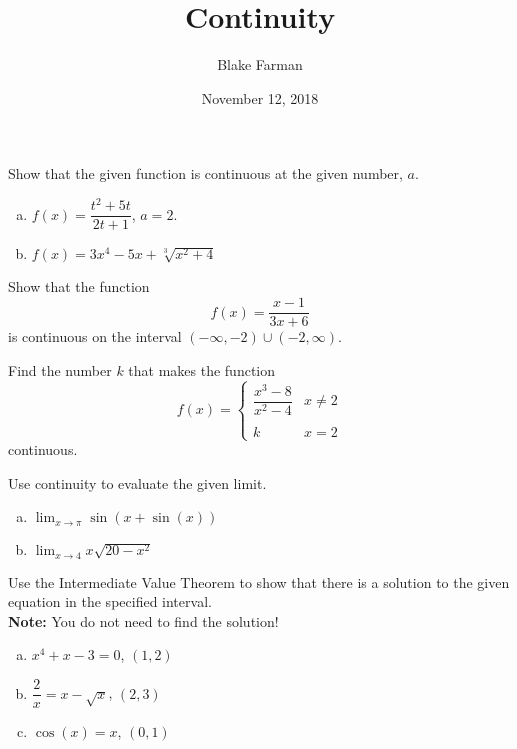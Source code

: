 \documentclass[10pt]{amsart}
\title{Continuity}
\date{November 12, 2018}
\author{Blake Farman}
\begin{document}
\maketitle

\makenameslot

\begin{thm}
  Show that the given function is continuous at the given number, \(a\).
  \begin{enumerate}[(a)]
  \item
    \(f(x) = \dfrac{t^2 + 5t}{2t + 1}\), \(a = 2\).
    \vspace{2in}
  \item
    \(\displaystyle{f(x) = 3x^4 - 5x + \sqrt[3]{x^2 +4}}\)
  \end{enumerate}
\end{thm}

\newpage

\begin{thm}
  Show that the function
  \[f(x) = \frac{x - 1}{3x + 6}\]
  is continuous on the interval \((-\infty, -2) \cup (-2,\infty)\).
\end{thm}

\vspace{2in}

\begin{thm}
  Find the number \(k\) that makes the function
  \[f(x) = \left\{\begin{array}{cc}
  \dfrac{x^3 - 8}{x^2 - 4} & x \neq 2\\
  \\
  k & x = 2
  \end{array}\right.\]
  continuous.
\end{thm}

\vspace{2in}

\begin{thm}
  Use continuity to evaluate the given limit.
  \begin{enumerate}[(a)]
  \item
    \(\displaystyle{\lim_{x \to \pi} \sin\left(x + \sin(x)\right)}\)
    \vspace{1in}
  \item
    \(\displaystyle{\lim_{x \to 4} x\sqrt{20 - x^2}}\)
  \end{enumerate}
\end{thm}

\newpage

\begin{thm}
  Use the Intermediate Value Theorem to show that there is a solution to the given equation in the specified interval.\\
  \textbf{Note:} You do not need to find the solution!
  \begin{enumerate}[(a)]
  \item
    \(x^4 + x - 3 = 0\), \((1,2)\)
    \vspace{2in}
  \item
    \(\dfrac{2}{x} = x - \sqrt{x}\), \((2,3)\)
    \vspace{2in}
  \item
    \(\cos(x) = x\), \((0,1)\)
  \end{enumerate}
\end{thm}
\end{document}

